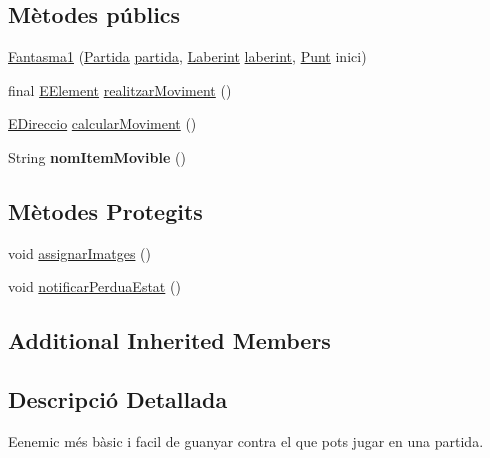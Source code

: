 \subsection*{Mètodes públics}
\begin{DoxyCompactItemize}
\item 
\hyperlink{classlogica_1_1_fantasma1_aee9773a1f660ba8c36da59caa79b36e9}{Fantasma1} (\hyperlink{classlogica_1_1_partida}{Partida} \hyperlink{classlogica_1_1_item_movible_ace55b4918a7f671f89ed3109c91359e4}{partida}, \hyperlink{classlogica_1_1laberints_1_1_laberint}{Laberint} \hyperlink{classlogica_1_1_item_movible_a97036130b7376d77776427ca126f6fb5}{laberint}, \hyperlink{classlogica_1_1_punt}{Punt} inici)
\item 
final \hyperlink{enumlogica_1_1enumeracions_1_1_e_element}{E\+Element} \hyperlink{classlogica_1_1_fantasma1_aedd0d00456866065de043652fc783c68}{realitzar\+Moviment} ()
\item 
\hyperlink{enumlogica_1_1enumeracions_1_1_e_direccio}{E\+Direccio} \hyperlink{classlogica_1_1_fantasma1_ac0020a6fef6ca6779711c58f04d993fc}{calcular\+Moviment} ()
\item 
\hypertarget{classlogica_1_1_fantasma1_ac013f39eb8452049f1c4449bd414fd79}{String {\bfseries nom\+Item\+Movible} ()}\label{classlogica_1_1_fantasma1_ac013f39eb8452049f1c4449bd414fd79}

\end{DoxyCompactItemize}
\subsection*{Mètodes Protegits}
\begin{DoxyCompactItemize}
\item 
void \hyperlink{classlogica_1_1_fantasma1_a4e887e1e0151f5fd35a202b323879bb1}{assignar\+Imatges} ()
\item 
void \hyperlink{classlogica_1_1_fantasma1_affe46017be82b1f54e68c41364a69fe3}{notificar\+Perdua\+Estat} ()
\end{DoxyCompactItemize}
\subsection*{Additional Inherited Members}


\subsection{Descripció Detallada}
Eenemic més bàsic i facil de guanyar contra el que pots jugar en una partida. 

